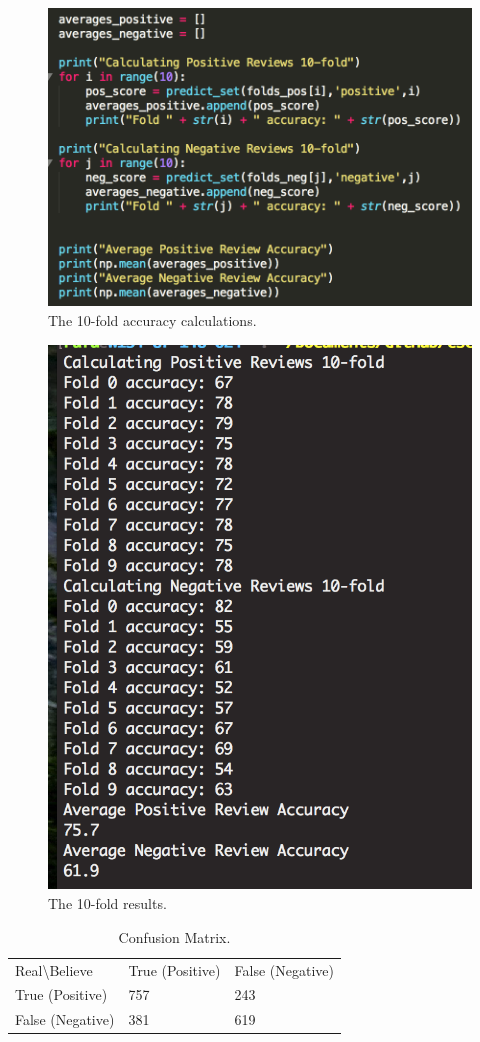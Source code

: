 \documentclass[12pt, letter]{article}
\begin{document}
 \begin{figure}[htb]
  \centering
  \includegraphics[width=0.7 \textwidth]{./figures/10_fold_averages.png}
  \caption{The 10-fold accuracy calculations.}
\end{figure}

 \begin{figure}[htb]
  \centering
  \includegraphics[width=0.7 \textwidth]{./figures/10_fold_result.png}
  \caption{The 10-fold results.}
\end{figure}

\begin{table}[]
\centering
\caption{Confusion Matrix.}
\label{my-label}
\begin{tabular}{lll}
Real\textbackslash{}Believe & True (Positive) & False (Negative) \\
True (Positive)             & 757             & 243              \\
False (Negative)            & 381             & 619             
\end{tabular}
\end{table}

\FloatBarrier
\end{document}
